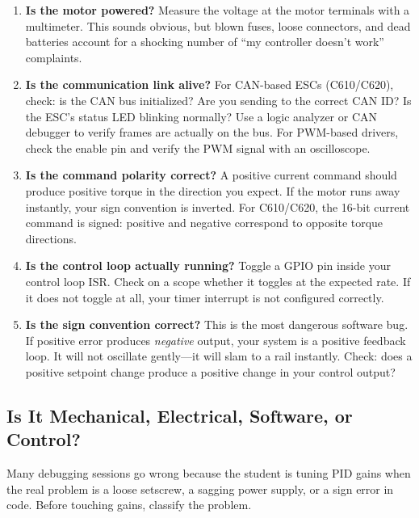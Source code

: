 \begin{enumerate}
    \item \textbf{Is the motor powered?} Measure the voltage at the motor terminals with a multimeter. This sounds obvious, but blown fuses, loose connectors, and dead batteries account for a shocking number of ``my controller doesn't work'' complaints.

    \item \textbf{Is the communication link alive?} For CAN-based ESCs (C610/C620), check: is the CAN bus initialized? Are you sending to the correct CAN ID? Is the ESC's status LED blinking normally? Use a logic analyzer or CAN debugger to verify frames are actually on the bus. For PWM-based drivers, check the enable pin and verify the PWM signal with an oscilloscope.

    \item \textbf{Is the command polarity correct?} A positive current command should produce positive torque in the direction you expect. If the motor runs away instantly, your sign convention is inverted. For C610/C620, the 16-bit current command is signed: positive and negative correspond to opposite torque directions.

    \item \textbf{Is the control loop actually running?} Toggle a GPIO pin inside your control loop ISR. Check on a scope whether it toggles at the expected rate. If it does not toggle at all, your timer interrupt is not configured correctly.

    \item \textbf{Is the sign convention correct?} This is the most dangerous software bug. If positive error produces \textit{negative} output, your system is a positive feedback loop. It will not oscillate gently---it will slam to a rail instantly. Check: does a positive setpoint change produce a positive change in your control output?
\end{enumerate}

\subsection{Is It Mechanical, Electrical, Software, or Control?}

Many debugging sessions go wrong because the student is tuning PID gains when the real problem is a loose setscrew, a sagging power supply, or a sign error in code. Before touching gains, classify the problem.

